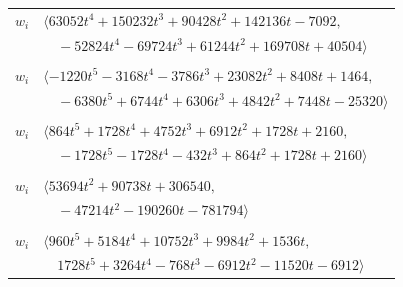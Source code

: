 \documentclass[11pt]{article}
\begin{document}
\begin{longtable}{@{}ll@{}}
$w_i$ & $\langle 63052t^{4}+150232t^{3}+90428t^{2}+142136t-7092,$\\
 & $\quad -52824t^{4}-69724t^{3}+61244t^{2}+169708t+40504\rangle$\\
\addlinespace[2pt]
\multicolumn{2}{@{}p{0.97\textwidth}@{}}{$i=51$, $D_i=1$, $\rho_{ij}$: $6{:}2, \allowbreak 10{:}1, \allowbreak 17{:}3, \allowbreak 20{:}3, \allowbreak 28{:}3, \allowbreak 34{:}2, \allowbreak 38{:}2, \allowbreak 45{:}2, \allowbreak 49{:}2, \allowbreak 58{:}2, \allowbreak 59{:}3, \allowbreak 64{:}2, \allowbreak 67{:}2, \allowbreak 74{:}3, \allowbreak 77{:}3, \allowbreak 79{:}3, \allowbreak 81{:}2$}\\
$w_i$ & $\langle -1220t^{5}-3168t^{4}-3786t^{3}+23082t^{2}+8408t+1464,$\\
 & $\quad -6380t^{5}+6744t^{4}+6306t^{3}+4842t^{2}+7448t-25320\rangle$\\
\addlinespace[2pt]
\multicolumn{2}{@{}p{0.97\textwidth}@{}}{$i=52$, $D_i=216$, $\rho_{ij}$: $2{:}3, \allowbreak 6{:}1, \allowbreak 9{:}2, \allowbreak 14{:}1, \allowbreak 25{:}2, \allowbreak 30{:}3, \allowbreak 39{:}2, \allowbreak 43{:}1, \allowbreak 71{:}1$}\\
$w_i$ & $\langle 864t^{5}+1728t^{4}+4752t^{3}+6912t^{2}+1728t+2160,$\\
 & $\quad -1728t^{5}-1728t^{4}-432t^{3}+864t^{2}+1728t+2160\rangle$\\
\addlinespace[2pt]
\multicolumn{2}{@{}p{0.97\textwidth}@{}}{$i=53$, $D_i=1$, $\rho_{ij}$: $6{:}2, \allowbreak 7{:}1, \allowbreak 15{:}2, \allowbreak 17{:}1, \allowbreak 18{:}3, \allowbreak 21{:}2, \allowbreak 31{:}3, \allowbreak 33{:}2, \allowbreak 34{:}2, \allowbreak 35{:}2, \allowbreak 36{:}1, \allowbreak 37{:}2, \allowbreak 39{:}1, \allowbreak 54{:}2, \allowbreak 60{:}1, \allowbreak 62{:}2, \allowbreak 65{:}3, \allowbreak 71{:}1, \allowbreak 78{:}1, \allowbreak 80{:}3$}\\
$w_i$ & $\langle 53694t^{2}+90738t+306540,$\\
 & $\quad -47214t^{2}-190260t-781794\rangle$\\
\addlinespace[2pt]
\multicolumn{2}{@{}p{0.97\textwidth}@{}}{$i=54$, $D_i=32$, $\rho_{ij}$: $3{:}3, \allowbreak 11{:}1, \allowbreak 25{:}2, \allowbreak 26{:}1, \allowbreak 28{:}1, \allowbreak 38{:}2, \allowbreak 46{:}3, \allowbreak 53{:}2, \allowbreak 56{:}3, \allowbreak 60{:}3, \allowbreak 63{:}1, \allowbreak 71{:}3$}\\
$w_i$ & $\langle 960t^{5}+5184t^{4}+10752t^{3}+9984t^{2}+1536t,$\\
 & $\quad 1728t^{5}+3264t^{4}-768t^{3}-6912t^{2}-11520t-6912\rangle$\\

\end{longtable}
\end{document}
